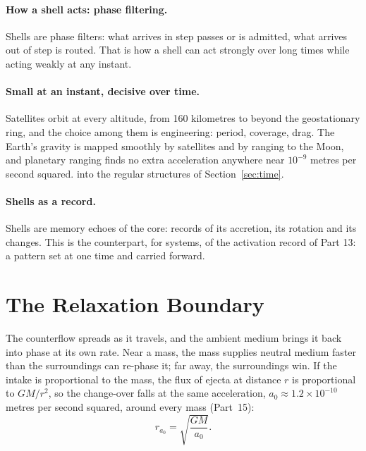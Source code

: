 \documentclass[11pt,a4paper]{article}
\begin{document}
\paragraph{How a shell acts: phase filtering.} Shells are phase filters: what arrives in step passes or is admitted, what arrives out of step is routed.  That is how a shell can act strongly over long times while acting weakly at any instant.

\paragraph{Small at an instant, decisive over time.}  Satellites orbit at every altitude, from 160 kilometres to beyond the geostationary ring, and the choice among them is engineering: period, coverage, drag. The Earth's gravity is mapped smoothly by satellites and by ranging to the Moon, and planetary ranging finds no extra acceleration anywhere near $10^{-9}$ metres per second squared.  into the regular structures of Section~\ref{sec:time}.

\paragraph{Shells as a record.} Shells are memory echoes of the core: records of its accretion, its rotation and its changes.  This is the counterpart, for systems, of the activation record of Part 13: a pattern set at one time and carried forward.

\section{The Relaxation Boundary}
\label{sec:boundary}

\begin{hypbar}
The counterflow spreads as it travels, and the ambient medium brings it back into phase at its own rate. Near a mass, the mass supplies neutral medium faster than the surroundings can re-phase it; far away, the surroundings win. If the intake is proportional to the mass, the flux of ejecta at distance $r$ is proportional to $GM/r^2$, so the change-over falls at the same acceleration, $a_0 \approx 1.2\times10^{-10}$ metres per second squared, around every mass (Part~15):
\begin{equation}
r_{a_0} = \sqrt{\frac{GM}{a_0}} .
\end{equation}
\end{hypbar}
\end{document}
